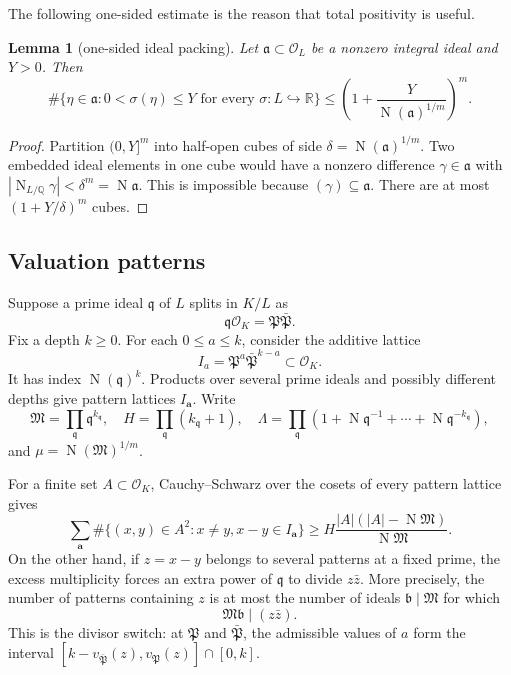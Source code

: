 \documentclass[11pt]{article}
\newtheorem{lemma}[theorem]{Lemma}
\theoremstyle{definition}
\theoremstyle{remark}
\newcommand{\cO}{\mathcal O}
\newcommand{\cM}{\mathfrak M}
\newcommand{\Q}{\mathbb Q}
\newcommand{\R}{\mathbb R}
\newcommand{\Nm}{\operatorname N}
\begin{document}
The following one-sided estimate is the reason that total positivity is
useful.

\begin{lemma}[one-sided ideal packing]\label{lem:ideal-packing}
Let $\mathfrak a\subset\cO_L$ be a nonzero integral ideal and $Y>0$.
Then
\[
 \#\{\eta\in\mathfrak a:0<\sigma(\eta)\le Y
       \text{ for every }\sigma:L\hookrightarrow\R\}
 \le \left(1+\frac{Y}{\Nm(\mathfrak a)^{1/m}}\right)^m. \tag{2.4}
\]
\end{lemma}

\begin{proof}
Partition $(0,Y]^m$ into half-open cubes of side
$\delta=\Nm(\mathfrak a)^{1/m}$.  Two embedded ideal elements in one cube
would have a nonzero difference $\gamma\in\mathfrak a$ with
$|\Nm_{L/\Q}\gamma|<\delta^m=\Nm\mathfrak a$.  This is impossible because
$(\gamma)\subseteq\mathfrak a$.  There are at most
$(1+Y/\delta)^m$ cubes.
\end{proof}

\subsection{Valuation patterns}

Suppose a prime ideal $\mathfrak q$ of $L$ splits in $K/L$ as
\[
 \mathfrak q\cO_K=\mathfrak P\bar{\mathfrak P}.
\]
Fix a depth $k\ge0$.  For each $0\le a\le k$, consider the additive
lattice
\[
 I_a=\mathfrak P^a\bar{\mathfrak P}^{k-a}\subset\cO_K. \tag{2.5}
\]
It has index $\Nm(\mathfrak q)^k$.  Products over several prime ideals and
possibly different depths give pattern lattices $I_{\mathbf a}$.  Write
\[
 \cM=\prod_{\mathfrak q}\mathfrak q^{k_{\mathfrak q}},
 \quad
 H=\prod_{\mathfrak q}(k_{\mathfrak q}+1),
 \quad
 \Lambda=\prod_{\mathfrak q}
     \left(1+\Nm\mathfrak q^{-1}+\cdots+
                 \Nm\mathfrak q^{-k_{\mathfrak q}}\right),             \tag{2.6}
\]
and $\mu=\Nm(\cM)^{1/m}$.

For a finite set $A\subset\cO_K$, Cauchy--Schwarz over the cosets of every
pattern lattice gives
\[
 \sum_{\mathbf a}\#\{(x,y)\in A^2:x\ne y, x-y\in I_{\mathbf a}\}
 \ge H\frac{|A|(|A|-\Nm\cM)}{\Nm\cM}.           \tag{2.7}\label{eq:pair-lower}
\]
On the other hand, if $z=x-y$ belongs to several patterns at a fixed prime,
the excess multiplicity forces an extra power of $\mathfrak q$ to divide
$z\bar z$.  More precisely, the number of patterns containing $z$ is at
most the number of ideals $\mathfrak b\mid\cM$ for which
\[
 \cM\mathfrak b\mid(z\bar z).                    \tag{2.8}\label{eq:divisor-switch}
\]
This is the divisor switch: at $\mathfrak P$ and
$\bar{\mathfrak P}$, the admissible values of $a$ form the interval
$[k-v_{\bar{\mathfrak P}}(z),v_{\mathfrak P}(z)]\cap[0,k]$.
\end{document}
